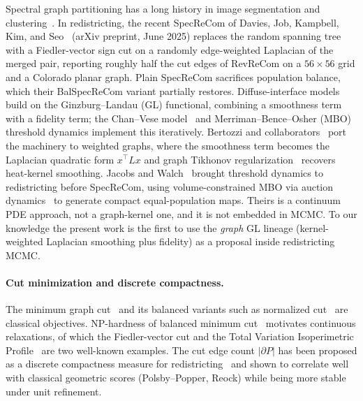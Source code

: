 \documentclass[11pt]{article}
\begin{document}
Spectral graph partitioning has a long history in image segmentation
and clustering~\cite{shi2000normalized}. In redistricting, the recent
SpecReCom of Davies, Job, Kampbell, Kim, and
Seo~\cite{davies2025spectral} (arXiv preprint, June 2025) replaces the
random spanning tree with a Fiedler-vector sign cut on a randomly
edge-weighted Laplacian of the merged pair, reporting roughly half the
cut edges of RevReCom on a $56 \times 56$ grid and a Colorado planar
graph. Plain SpecReCom sacrifices population balance, which their
BalSpecReCom variant partially restores. Diffuse-interface models
build on the Ginzburg--Landau (GL) functional, combining a smoothness
term with a fidelity term; the Chan--Vese model~\cite{chan2001active}
and Merriman--Bence--Osher (MBO) threshold dynamics implement this
iteratively. Bertozzi and collaborators~\cite{bertozzi2012diffuse,
merkurjev2013mbo} port the machinery to weighted graphs, where the
smoothness term becomes the Laplacian quadratic form $x^\top L x$ and
graph Tikhonov regularization~\cite{pilavci2021graph,shuman2013emerging}
recovers heat-kernel smoothing. Jacobs and Walch~\cite{jacobs2018pde}
brought threshold dynamics to redistricting before SpecReCom, using
volume-constrained MBO via auction dynamics~\cite{jacobs2018auction}
to generate compact equal-population maps. Theirs is a continuum PDE
approach, not a graph-kernel one, and it is not embedded in MCMC. To our
knowledge the present work is the first to use the \emph{graph} GL
lineage (kernel-weighted Laplacian smoothing plus fidelity) as a
proposal inside redistricting MCMC.

\paragraph{Cut minimization and discrete compactness.}\label{sec:related-cut}

The minimum graph cut~\cite{stoer1997simple,karger2000minimum} and its
balanced variants such as normalized cut~\cite{shi2000normalized} are
classical objectives. NP-hardness of balanced minimum
cut~\cite{wagner1993between} motivates continuous relaxations, of
which the Fiedler-vector cut and the Total Variation Isoperimetric
Profile~\cite{deford2019total} are two well-known examples. The cut
edge count $|\partial P|$ has been proposed as a discrete compactness
measure for redistricting~\cite{duchin2018discrete} and shown to
correlate well with classical geometric scores (Polsby--Popper, Reock)
while being more stable under unit refinement.
\end{document}
